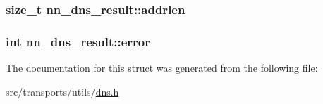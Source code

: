 \subsubsection[{addrlen}]{\setlength{\rightskip}{0pt plus 5cm}size\+\_\+t nn\+\_\+dns\+\_\+result\+::addrlen}\hypertarget{structnn__dns__result_ab1533870912af14f5143555a83d6b36e}{}\label{structnn__dns__result_ab1533870912af14f5143555a83d6b36e}
\subsubsection[{error}]{\setlength{\rightskip}{0pt plus 5cm}int nn\+\_\+dns\+\_\+result\+::error}\hypertarget{structnn__dns__result_ad567eeaddc0e791da283e28911a1fe63}{}\label{structnn__dns__result_ad567eeaddc0e791da283e28911a1fe63}


The documentation for this struct was generated from the following file\+:\begin{DoxyCompactItemize}
\item 
src/transports/utils/\hyperlink{dns_8h}{dns.\+h}\end{DoxyCompactItemize}
